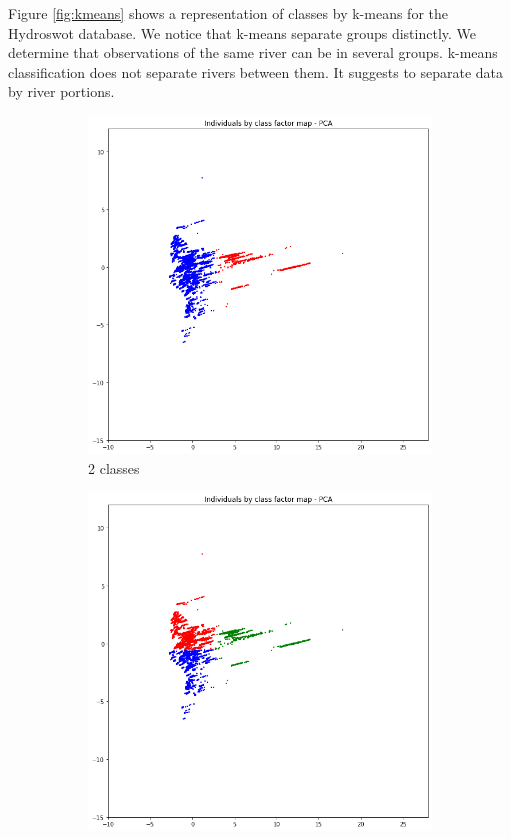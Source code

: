Figure \ref{fig:kmeans} shows a representation of classes by k-means for the Hydroswot database. We notice that k-means separate groups distinctly. We determine that observations of the same river can be in several groups. k-means classification does not separate rivers between them. It suggests to separate data by river portions.
\begin{figure}[H]
    \begin{subfigure}{0.45 \textwidth}
        \centering
        \includegraphics[scale = 0.35]{Graph/kmeans2HS.png}
        \caption{2 classes}
    \end{subfigure}
\centering
    \begin{subfigure} {0.45 \textwidth}
        \centering
        \includegraphics[scale = 0.35]{Graph/kmeans3HS.png}

\end{subfigure}
\end{figure}

